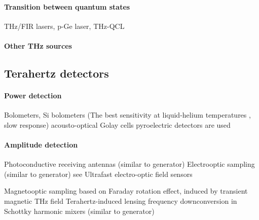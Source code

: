 \paragraph{Transition between quantum states}
 THz/FIR lasers, p-Ge laser, THz-QCL

\paragraph{Other THz sources}%


\subsection{Terahertz detectors}
\paragraph{Power detection}%
Bolometers, Si bolometers (The best sensitivity at liquid-helium temperatures ,  slow response)
acousto-optical Golay cells
pyroelectric detectors are used
\paragraph{Amplitude detection}%
Photoconductive receiving antennas (similar to generator)
Electrooptic sampling (similar to generator)
see 
Ultrafast electro-optic field sensors

Magnetooptic sampling based on Faraday rotation effect, induced by transient magnetic THz field
Terahertz-induced lensing 
frequency downconversion in Schottky harmonic mixers (similar to generator)


